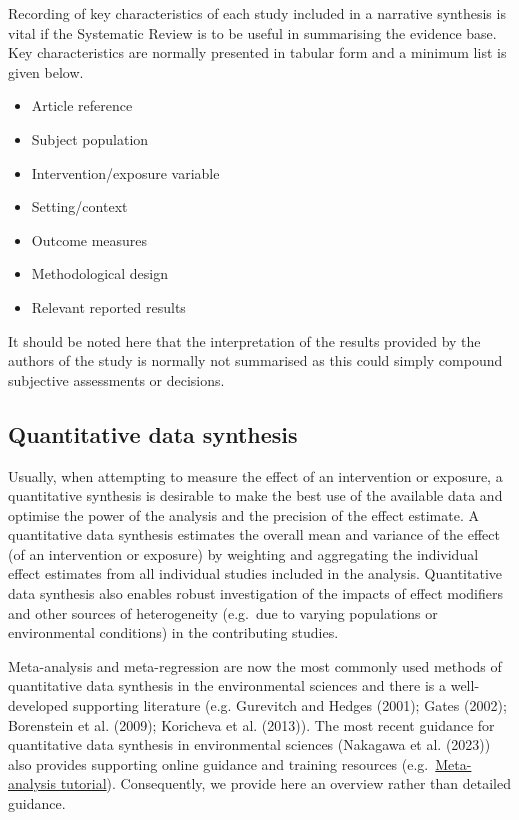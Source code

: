 \documentclass[
  letterpaper,
  DIV=11,
  numbers=noendperiod]{scrreprt}
\begin{document}
Recording of key characteristics of each study included in a narrative
synthesis is vital if the Systematic Review is to be useful in
summarising the evidence base. Key characteristics are normally
presented in tabular form and a minimum list is given below.

\begin{itemize}
\item
  Article reference
\item
  Subject population
\item
  Intervention/exposure variable
\item
  Setting/context
\item
  Outcome measures
\item
  Methodological design
\item
  Relevant reported results
\end{itemize}

It should be noted here that the interpretation of the results provided
by the authors of the study is normally not summarised as this could
simply compound subjective assessments or decisions.

\subsection{Quantitative data
synthesis}\label{quantitative-data-synthesis}

Usually, when attempting to measure the effect of an intervention or
exposure, a quantitative synthesis is desirable to make the best use of
the available data and optimise the power of the analysis and the
precision of the effect estimate. A quantitative data synthesis
estimates the overall mean and variance of the effect (of an
intervention or exposure) by weighting and aggregating the individual
effect estimates from all individual studies included in the analysis.
Quantitative data synthesis also enables robust investigation of the
impacts of effect modifiers and other sources of heterogeneity (e.g.~due
to varying populations or environmental conditions) in the contributing
studies.

Meta-analysis and meta-regression are now the most commonly used methods
of quantitative data synthesis in the environmental sciences and there
is a well-developed supporting literature (e.g. Gurevitch and Hedges
(2001); Gates (2002); Borenstein et al. (2009); Koricheva et al.
(2013)). The most recent guidance for quantitative data synthesis in
environmental sciences ({Nakagawa et al.} (2023)) also provides
supporting online guidance and training resources
(e.g.~\href{https://itchyshin.github.io/Meta-analysis_tutorial/}{Meta-analysis
tutorial}). Consequently, we provide here an overview rather than
detailed guidance.
\end{document}
